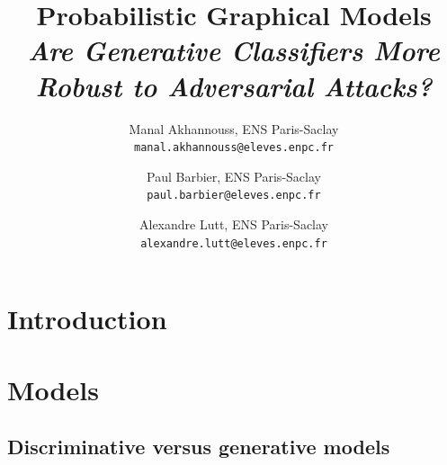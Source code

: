 \documentclass[11pt,twocolumn,letterpaper]{article}
\begin{document}
\title{\LARGE Probabilistic Graphical Models \\ \textit{Are Generative Classiﬁers More Robust to Adversarial Attacks?}}

\author{Manal Akhannouss, ENS Paris-Saclay\\
{\tt\small manal.akhannouss@eleves.enpc.fr}
\and
Paul Barbier, ENS Paris-Saclay\\
{\tt\small paul.barbier@eleves.enpc.fr}
\and
Alexandre Lutt, ENS Paris-Saclay\\
{\tt\small alexandre.lutt@eleves.enpc.fr}
}
\maketitle


\section{Introduction}
\label{sec:intro}

\paragraph{} 


\section{Models}
\label{sec:models}

\paragraph{}

\subsection{Discriminative versus generative models}
\end{document}
